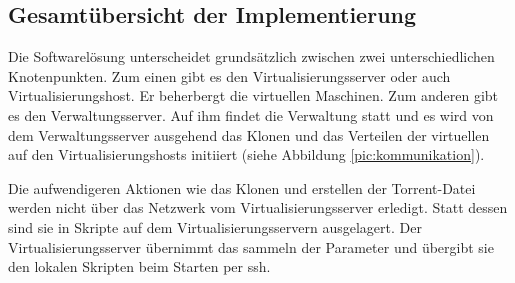 \subsection{Gesamtübersicht der Implementierung}
Die Softwarelösung unterscheidet grundsätzlich zwischen zwei unterschiedlichen Knotenpunkten. Zum einen gibt es den Virtualisierungsserver oder auch Virtualisierungshost. Er beherbergt die virtuellen Maschinen. Zum anderen gibt es den Verwaltungsserver. Auf ihm findet die Verwaltung statt und es wird von dem Verwaltungsserver ausgehend das Klonen und das Verteilen der virtuellen auf den Virtualisierungshosts initiiert (siehe Abbildung \ref{pic:kommunikation}).


Die aufwendigeren Aktionen wie das Klonen und erstellen der Torrent-Datei werden nicht über das Netzwerk vom Virtualisierungsserver erledigt. Statt dessen sind sie in Skripte auf dem Virtualisierungsservern ausgelagert. Der Virtualisierungsserver übernimmt das sammeln der Parameter und übergibt sie den lokalen Skripten beim Starten per ssh.
